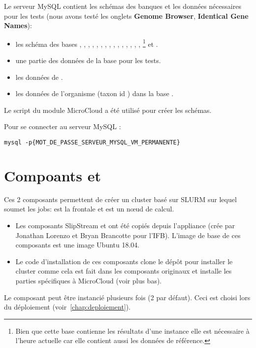 Le serveur MySQL contient les schémas des banques et les données nécessaires pour les tests (nous avons testé les onglets \textbf{Genome Browser}, \textbf{Identical Gene Names}):
\begin{itemize}
    \item les schéma des bases , , , , , , , ,
          , , , , , , , \footnote{Bien que cette base contienne les résultats d'une instance elle est nécessaire à l'heure actuelle car elle contient aussi les données de référence.}
          et .
    \item une partie des données de la base  pour les tests.
    \item les données de .
    \item les données de l'organisme \theOrg{} (taxon id \theTaxID{}) dans la base .
\end{itemize}

Le script  du module MicroCloud a été utilisé pour créer les schémas.

Pour se connecter au serveur MySQL :
\begin{lstlisting}[style=bash]
mysql -p{MOT_DE_PASSE_SERVEUR_MYSQL_VM_PERMANENTE}
\end{lstlisting}

\section{Compoants  et } \label{master&slave}

Ces 2 composants permettent de créer un cluster basé sur SLURM sur lequel  soumet les jobs:
 est la frontale et  est un nœud de calcul.
\begin{itemize}
    \item Les composants SlipStream  et  ont été copiés depuis
    l'appliance \href{https://nuv.la/module/ifb/devzone/jlorenzo/cluster/Slurm_Cluster_ubuntu18}{}
          (crée par Jonathan Lorenzo et Bryan Brancotte pour l'IFB).
          L'image de base de ces composants est une image Ubuntu 18.04.
    \item Le code d'installation de ces composants clone le dépôt  pour installer le cluster
          comme cela est fait dans les composants originaux
          et installe les parties spécifiques à MicroCloud (voir plus bas).
\end{itemize}
Le composant  peut être instancié plusieurs fois (2 par défaut).
Ceci est choisi lors du déploiement (voir~\autoref{chap:deploiement}).

